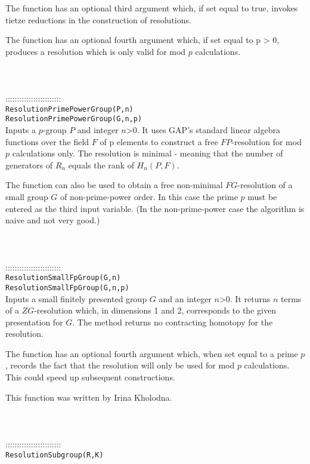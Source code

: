 \documentclass[a4paper,11pt]{report}
\begin{document}
{ The function has an optional third argument which, if set equal to true,
invokes tietze reductions in the construction of resolutions.

 The function has an optional fourth argument which, if set equal to p
{\textgreater} 0, produces a resolution which is only valid for mod $p$ calculations. \\
 \\
 \\
 \\
 ::::::::::::::::::::::::\\
 \texttt{ResolutionPrimePowerGroup(P,n) }\\
 \texttt{ResolutionPrimePowerGroup(G,n,p)}\\
 

 Inputs a $p$-group $P$ and integer $n${\textgreater}$0$. It uses GAP's standard linear algebra functions over the field $F$ of p elements to construct a free $FP$-resolution for mod $p$ calculations only. The resolution is minimal - meaning that the number of
generators of $R_n$ equals the rank of $H_n(P,F)$. 

 The function can also be used to obtain a free non-minimal $FG$-resolution of a small group $G$ of non-prime-power order. In this case the prime $p$ must be entered as the third input variable. (In the non-prime-power case the
algorithm is naive and not very good.) \\
 \\
 \\
 \\
 ::::::::::::::::::::::::\\
 \texttt{ResolutionSmallFpGroup(G,n) }\\
 \texttt{ResolutionSmallFpGroup(G,n,p) }\\
 

 Inputs a small finitely presented group $G$ and an integer $n${\textgreater}$0$. It returns $n$ terms of a $ZG$-resolution which, in dimensions 1 and 2, corresponds to the given
presentation for $G$. The method returns no contracting homotopy for the resolution.

 The function has an optional fourth argument which, when set equal to a prime $p$, records the fact that the resolution will only be used for mod $p$ calculations. This could speed up subsequent constructions. 

 This function was written by Irina Kholodna. \\
 \\
 \\
 \\
 ::::::::::::::::::::::::\\
 \texttt{ResolutionSubgroup(R,K)}\\
 

}
\end{document}
